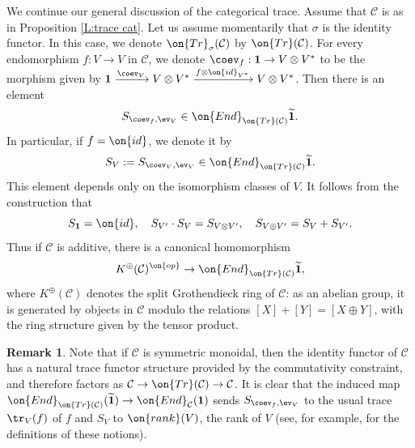 \documentclass[11pt]{amsart}
\theoremstyle{definition}
\theoremstyle{definition}
\newtheorem{rmk}[thm]{Remark}
\theoremstyle{definition}
\numberwithin{equation}{subsection}
\newcommand{\mC}{{\mathcal C}}
\newcommand{\End}{{\on{End}}}
\newcommand{\id}{{\on{id}}}
\newcommand{\Tr}{{\on{Tr}}}
\begin{document}
We continue our general discussion of the categorical trace. Assume that $\mC$ is as in Proposition \ref{L:trace cat}.
Let us assume momentarily that $\sigma$ is the identity functor. In this case, we denote $\Tr_\sigma(\mC)$ by $\Tr(\mC)$. For every endomorphism $f: V\to V$ in $\mC$, we denote $\coev_f:\mathbf{1}\to V\otimes V^*$ to be the morphism given by $\mathbf{1}\xrightarrow{\coev_V}V\otimes V^*\xrightarrow{f\otimes\id_{V^*}}V\otimes V^*$. Then
there is an element
\[S_{\coev_f,\ev_V}\in \End_{\Tr(\mC)}\widetilde{\mathbf{1}}.\]
In particular, if $f=\id$, we denote it by
\begin{equation}
\label{E:abs S}
S_V:=S_{\coev_{V},\ev_{V}}\in \End_{\Tr(\mC)}\widetilde{\mathbf{1}}.
\end{equation}
This element depends only on the isomorphism classes of $V$. It follows from the construction that
\[S_{\mathbf{1}}=\id,\quad S_{V'}\cdot S_{V}=S_{V\otimes V'},\quad S_{V\oplus V'}=S_V+S_{V'}.\]
Thus if $\mC$ is additive, there is a canonical homomorphism 
\begin{equation}
\label{E: K to End}
K^{\oplus}(\mC)^{\on{op}}\to \End_{\Tr(\mC)}\widetilde{\mathbf{1}},
\end{equation}
where $K^{\oplus}(\mC)$ denotes the split Grothendieck ring of $\mC$: as an abelian group, it is generated by objects in $\mC$ modulo the relations $[X]+[Y]=[X\oplus Y]$, with the ring structure given by the tensor product.

\begin{rmk}
Note that if $\mC$ is symmetric monoidal, then the identity functor of $\mC$ has a natural trace functor structure provided by the commutativity constraint, and therefore factors as $\mC\to \Tr(\mC)\to \mC$. It is clear that the induced map $\End_{\Tr(\mC)}(\widetilde{\mathbf{1}})\to \End_\mC(\mathbf{1})$ sends $S_{\coev_f,\ev_V}$ to the usual trace $\tr_V(f)$ of $f$ and $S_V$ to $\on{rank}(V)$, the rank of $V$  (see, for example, \cite[(1.7.3)]{DM} for the definitions of these notions).
\end{rmk}
\end{document}
